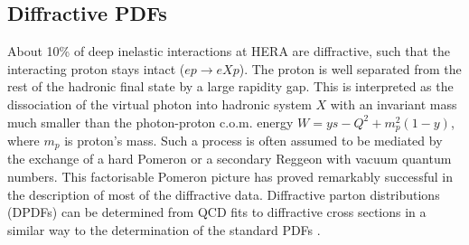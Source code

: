 \subsection{Diffractive PDFs}

\newcommand{\asotp}{\ensuremath{\frac{\alpha_{\rm s}}{2\pi}}}
\newcommand{\Sgl}[1]{\ensuremath{\tilde f_{#1+}}}
\newcommand{\Pom}{{I\!P}}
\newcommand{\Reg}{{I\!R}}
\newcommand{\xpom}{$x_{I\!P}$}
\newcommand{\xP}{x_\Pom}


About 10\% of deep inelastic interactions at HERA are diffractive, such that the interacting proton stays intact ($ep\to eXp$). 
The proton is well separated from the 
rest of the hadronic final state by a large rapidity gap.  
This is interpreted as the dissociation of the virtual photon into
hadronic system $X$ with an invariant mass much 
smaller than the photon-proton c.o.m. energy $W=ys-Q^2+m_p^2(1-y)$, where $m_p$ is proton's mass. Such a process is often assumed to be mediated by the exchange of a hard Pomeron 
or a secondary Reggeon with vacuum quantum numbers. 
This factorisable Pomeron picture has proved remarkably successful in the description of most of the diffractive data.
Diffractive parton distributions (DPDFs) 
can be determined from QCD fits to diffractive cross sections in a similar way to the determination of the standard PDFs \cite{Collins:1997sr}.

%

